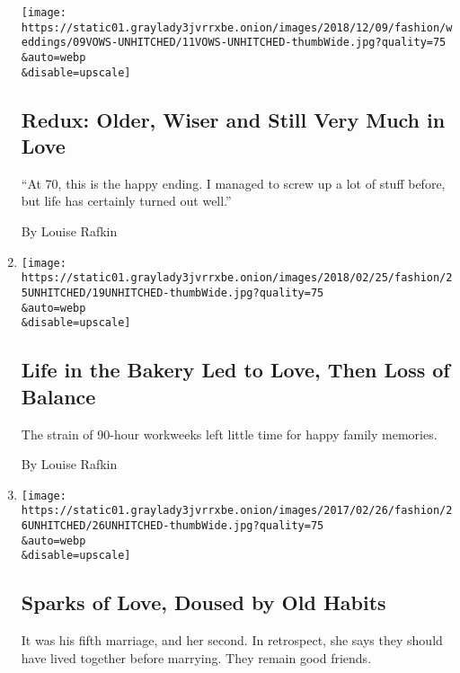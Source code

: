 \begin{enumerate}
  \texttt{[image: https://static01.graylady3jvrrxbe.onion/images/2018/12/09/fashion/weddings/09VOWS-UNHITCHED/11VOWS-UNHITCHED-thumbWide.jpg?quality=75\\\&auto=webp\\\&disable=upscale]}

  \hypertarget{redux-older-wiser-and-still-very-much-in-love}{%
  \subsection{Redux: Older, Wiser and Still Very Much in
  Love}\label{redux-older-wiser-and-still-very-much-in-love}}

  ``At 70, this is the happy ending. I managed to screw up a lot of
  stuff before, but life has certainly turned out well.''

  By Louise Rafkin
\item
  \href{/2018/02/20/fashion/weddings/life-in-the-bakery-led-to-love-then-loss-of-balance.html}{}

  \texttt{[image: https://static01.graylady3jvrrxbe.onion/images/2018/02/25/fashion/25UNHITCHED/19UNHITCHED-thumbWide.jpg?quality=75\\\&auto=webp\\\&disable=upscale]}

  \hypertarget{life-in-the-bakery-led-to-love-then-loss-of-balance}{%
  \subsection{Life in the Bakery Led to Love, Then Loss of
  Balance}\label{life-in-the-bakery-led-to-love-then-loss-of-balance}}

  The strain of 90-hour workweeks left little time for happy family
  memories.

  By Louise Rafkin
\item
  \href{/2017/02/22/fashion/weddings/sparks-of-love-doused-by-old-habits.html}{}

  \texttt{[image: https://static01.graylady3jvrrxbe.onion/images/2017/02/26/fashion/26UNHITCHED/26UNHITCHED-thumbWide.jpg?quality=75\\\&auto=webp\\\&disable=upscale]}

  \hypertarget{sparks-of-love-doused-by-old-habits}{%
  \subsection{Sparks of Love, Doused by Old
  Habits}\label{sparks-of-love-doused-by-old-habits}}

  It was his fifth marriage, and her second. In retrospect, she says
  they should have lived together before marrying. They remain good
  friends.


\end{enumerate}
